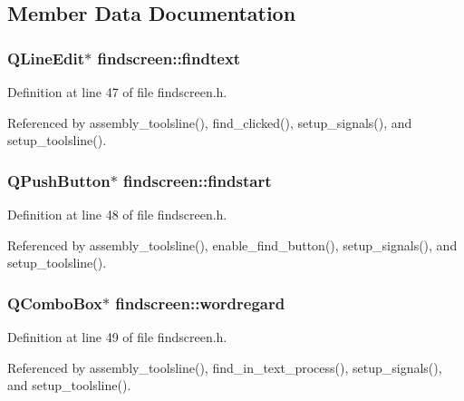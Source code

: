 \subsection{Member Data Documentation}
\subsubsection{\setlength{\rightskip}{0pt plus 5cm}QLine\-Edit$\ast$ {\bf findscreen::findtext}\hspace{0.3cm}{\tt  [private]}}\label{classfindscreen_c25b87182f109dfaf2a7637388792e3d}




Definition at line 47 of file findscreen.h.

Referenced by assembly\_\-toolsline(), find\_\-clicked(), setup\_\-signals(), and setup\_\-toolsline().
\subsubsection{\setlength{\rightskip}{0pt plus 5cm}QPush\-Button$\ast$ {\bf findscreen::findstart}\hspace{0.3cm}{\tt  [private]}}\label{classfindscreen_47c5f30908e29b78cfb6c3976ac7a29e}




Definition at line 48 of file findscreen.h.

Referenced by assembly\_\-toolsline(), enable\_\-find\_\-button(), setup\_\-signals(), and setup\_\-toolsline().
\subsubsection{\setlength{\rightskip}{0pt plus 5cm}QCombo\-Box$\ast$ {\bf findscreen::wordregard}\hspace{0.3cm}{\tt  [private]}}\label{classfindscreen_65acfc42865bbda3765bbc573872947c}




Definition at line 49 of file findscreen.h.

Referenced by assembly\_\-toolsline(), find\_\-in\_\-text\_\-process(), setup\_\-signals(), and setup\_\-toolsline().
